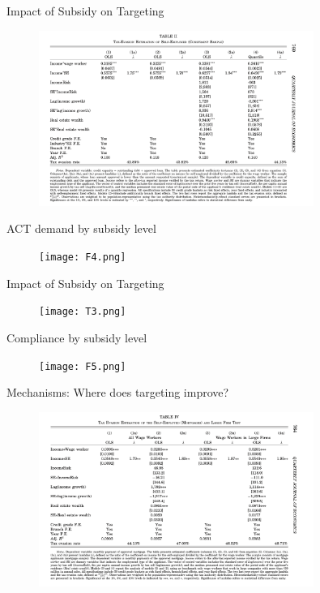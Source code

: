 \documentclass{beamer}
\begin{document}
\begin{frame}{Impact of Subsidy on Targeting}
\begin{figure}
    \includegraphics[width=0.8\textwidth, height=0.8\textheight]{T2.png}
\end{figure}
\end{frame}

\begin{frame}{ACT demand by subsidy level}
\begin{figure}
    \texttt{[image: F4.png]}
\end{figure}
    \end{frame}


            
\begin{frame}{Impact of Subsidy on Targeting}
\begin{figure}
    \texttt{[image: T3.png]}
\end{figure}
\end{frame}


\begin{frame}{Compliance by subsidy level}
    \begin{figure}
        \texttt{[image: F5.png]}
    \end{figure}
        \end{frame}

\begin{frame}{Mechanisms: Where does targeting improve?}
\begin{figure}
    \includegraphics[width=0.8\textwidth, height=0.8\textheight]{T4.png}
\end{figure}

\end{frame}
\end{document}

